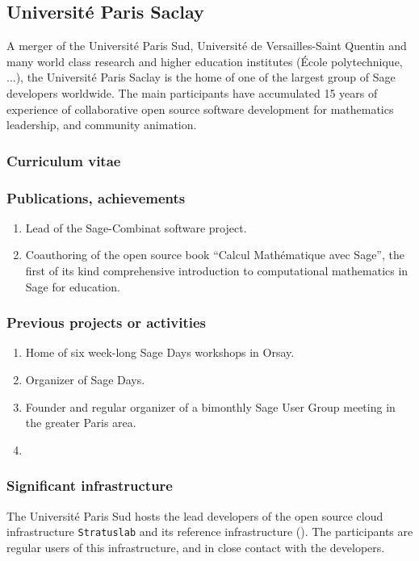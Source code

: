 \subsection*{Université Paris Saclay}

A merger of the Université Paris Sud, Université de Versailles-Saint
Quentin and many world class research and higher education institutes
(École polytechnique, ...), the Université Paris Saclay is the home of
one of the largest group of Sage developers worldwide. The main
participants have accumulated 15 years of experience of collaborative
open source software development for mathematics leadership, and
community animation.

\subsubsection*{Curriculum vitae}



\subsubsection*{Publications, achievements}

\begin{enumerate}
\item Lead of the Sage-Combinat software project.
\item Coauthoring of the open source book ``Calcul Mathématique avec
  Sage'', the first of its kind comprehensive introduction to
  computational mathematics in Sage for education.
\end{enumerate}


\subsubsection*{Previous projects or activities}

\begin{enumerate}
\item Home of six week-long Sage Days workshops in Orsay.
\item Organizer of  Sage Days.
\item Founder and regular organizer of a bimonthly Sage User Group
  meeting in the greater Paris area.
\item {}
\end{enumerate}

\subsubsection*{Significant infrastructure}

The Université Paris Sud hosts the lead developers of the open source
cloud infrastructure \texttt{Stratuslab} and its reference
infrastructure (). The participants are regular users
of this infrastructure, and in close contact with the developers.
